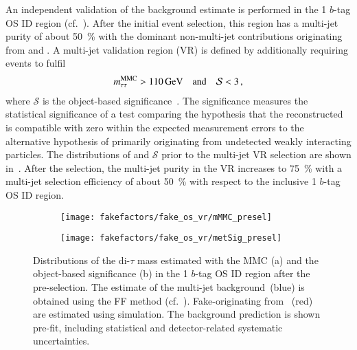 An independent validation of the background estimate is performed in the 1
$b$-tag OS ID region (cf.\ ). After the initial
event selection, this region has a multi-jet purity of about \SI{50}{\percent}
with the dominant non-multi-jet contributions originating from \Zjets and
\ttbar. A multi-jet validation region (VR) is defined by additionally requiring
events to fulfil
\begin{align*}
  m_{\tau\tau}^\text{MMC} > \SI{110}{\ensuremath{\text{GeV}}} \quad \text{and} \quad \mathcal{S} < 3 \,\text{,}
\end{align*}
where $\mathcal{S}$ is the object-based \pTmissAbs
significance~\cite{ATLAS-CONF-2018-038}. The \pTmissAbs significance measures
the statistical significance of a test comparing the hypothesis that the
reconstructed \pTmissAbs is compatible with zero within the expected measurement
errors to the alternative hypothesis of \pTmissAbs primarily originating from
undetected weakly interacting particles. The distributions of \mMMC and
$\mathcal{S}$ prior to the multi-jet VR selection are shown
in~. After the selection, the multi-jet
purity in the VR increases to \SI{75}{\percent} with a multi-jet selection
efficiency of about \SI{50}{\percent} with respect to the inclusive 1 $b$-tag OS
ID region.


\begin{figure}[htbp]
  \centering

  \begin{subfigure}{0.44\textwidth}
    \texttt{[image: fakefactors/fake\_os\_vr/mMMC\_presel]}
    \subcaption{}
  \end{subfigure}\hspace*{0.04\textwidth}%
  \begin{subfigure}{0.44\textwidth}
    \texttt{[image: fakefactors/fake\_os\_vr/metSig\_presel]}
    \subcaption{}
  \end{subfigure}

  \caption{Distributions of the di-$\tau$ mass estimated with the MMC (a) and
    the object-based \pTmissAbs significance (b) in the 1 $b$-tag OS ID region
    after the pre-selection. The estimate of the multi-jet background~(blue) is
    obtained using the FF method
    (cf.~). Fake-\tauhadvis originating from
    \ttbar~(red) are estimated using simulation. The background prediction is
    shown pre-fit, including statistical and detector-related systematic
    uncertainties.}%
  \label{fig:fake_factor_OSVR_cutvars}
\end{figure}

